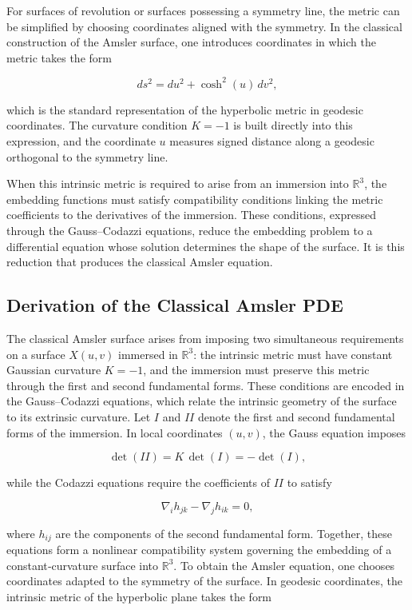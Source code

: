 \documentclass[final,onefignum,onetabnum]{siamart}
\begin{document}
For surfaces of revolution or surfaces possessing a symmetry line, the metric can be simplified by choosing coordinates aligned with the symmetry. In the classical construction of the Amsler surface, one introduces coordinates in which the metric takes the form


\[
ds^2 = du^2 + \cosh^2(u)\,dv^2,
\]


which is the standard representation of the hyperbolic metric in geodesic coordinates. The curvature condition $K = -1$ is built directly into this expression, and the coordinate $u$ measures signed distance along a geodesic orthogonal to the symmetry line.

When this intrinsic metric is required to arise from an immersion into $\mathbb{R}^3$, the embedding functions must satisfy compatibility conditions linking the metric coefficients to the derivatives of the immersion. These conditions, expressed through the Gauss–Codazzi equations, reduce the embedding problem to a differential equation whose solution determines the shape of the surface. It is this reduction that produces the classical Amsler equation.

\subsection{Derivation of the Classical Amsler PDE}

The classical Amsler surface arises from imposing two simultaneous requirements on a surface $X(u,v)$ immersed in $\mathbb{R}^3$: the intrinsic metric must have constant Gaussian curvature $K = -1$, and the immersion must preserve this metric through the first and second fundamental forms. These conditions are encoded in the Gauss–Codazzi equations, which relate the intrinsic geometry of the surface to its extrinsic curvature.
Let $I$ and $II$ denote the first and second fundamental forms of the immersion. In local coordinates $(u,v)$, the Gauss equation imposes


\[
\det(II) = K\,\det(I) = -\det(I),
\]


while the Codazzi equations require the coefficients of $II$ to satisfy


\[
\nabla_i h_{jk} - \nabla_j h_{ik} = 0,
\]


where $h_{ij}$ are the components of the second fundamental form. Together, these equations form a nonlinear compatibility system governing the embedding of a constant‑curvature surface into $\mathbb{R}^3$.
To obtain the Amsler equation, one chooses coordinates adapted to the symmetry of the surface. In geodesic coordinates, the intrinsic metric of the hyperbolic plane takes the form
\end{document}
